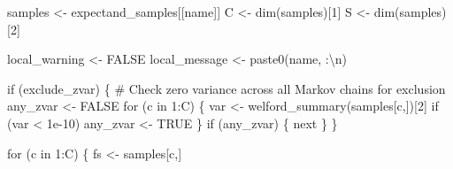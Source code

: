 \documentclass[
  letterpaper,
  DIV=11,
  numbers=noendperiod]{scrartcl}
\newenvironment{Shaded}{\begin{snugshade}}{\end{snugshade}}
\newcommand{\BuiltInTok}[1]{\textcolor[rgb]{0.00,0.23,0.31}{#1}}
\newcommand{\CharTok}[1]{\textcolor[rgb]{0.13,0.47,0.30}{#1}}
\newcommand{\CommentTok}[1]{\textcolor[rgb]{0.37,0.37,0.37}{#1}}
\newcommand{\ControlFlowTok}[1]{\textcolor[rgb]{0.00,0.23,0.31}{#1}}
\newcommand{\DecValTok}[1]{\textcolor[rgb]{0.68,0.00,0.00}{#1}}
\newcommand{\FloatTok}[1]{\textcolor[rgb]{0.68,0.00,0.00}{#1}}
\newcommand{\KeywordTok}[1]{\textcolor[rgb]{0.00,0.23,0.31}{#1}}
\newcommand{\NormalTok}[1]{\textcolor[rgb]{0.00,0.23,0.31}{#1}}
\newcommand{\OperatorTok}[1]{\textcolor[rgb]{0.37,0.37,0.37}{#1}}
\newcommand{\StringTok}[1]{\textcolor[rgb]{0.13,0.47,0.30}{#1}}
\begin{document}
\begin{Shaded}
\begin{Highlighting}[]
\NormalTok{    samples }\OperatorTok{\textless{}{-}}\NormalTok{ expectand\_samples[[name]]}
\NormalTok{    C }\OperatorTok{\textless{}{-}}\NormalTok{ dim(samples)[}\DecValTok{1}\NormalTok{]}
\NormalTok{    S }\OperatorTok{\textless{}{-}}\NormalTok{ dim(samples)[}\DecValTok{2}\NormalTok{]}
    
\NormalTok{    local\_warning }\OperatorTok{\textless{}{-}}\NormalTok{ FALSE}
\NormalTok{    local\_message }\OperatorTok{\textless{}{-}}\NormalTok{ paste0(name, }\StringTok{\textquotesingle{}:}\CharTok{\textbackslash{}n}\StringTok{\textquotesingle{}}\NormalTok{)}
  
    \ControlFlowTok{if}\NormalTok{ (exclude\_zvar) \{}
      \CommentTok{\# Check zero variance across all Markov chains for exclusion}
\NormalTok{      any\_zvar }\OperatorTok{\textless{}{-}}\NormalTok{ FALSE}
      \ControlFlowTok{for}\NormalTok{ (c }\KeywordTok{in} \DecValTok{1}\NormalTok{:C) \{}
\NormalTok{        var }\OperatorTok{\textless{}{-}}\NormalTok{ welford\_summary(samples[c,])[}\DecValTok{2}\NormalTok{]}
        \ControlFlowTok{if}\NormalTok{ (var }\OperatorTok{\textless{}} \FloatTok{1e{-}10}\NormalTok{)}
\NormalTok{          any\_zvar }\OperatorTok{\textless{}{-}}\NormalTok{ TRUE}
\NormalTok{      \}}
      \ControlFlowTok{if}\NormalTok{ (any\_zvar) \{}
        \BuiltInTok{next}
\NormalTok{      \}}
\NormalTok{    \}}
  
    \ControlFlowTok{for}\NormalTok{ (c }\KeywordTok{in} \DecValTok{1}\NormalTok{:C) \{}
\NormalTok{      fs }\OperatorTok{\textless{}{-}}\NormalTok{ samples[c,]}
      

\end{Highlighting}
\end{Shaded}
\end{document}
